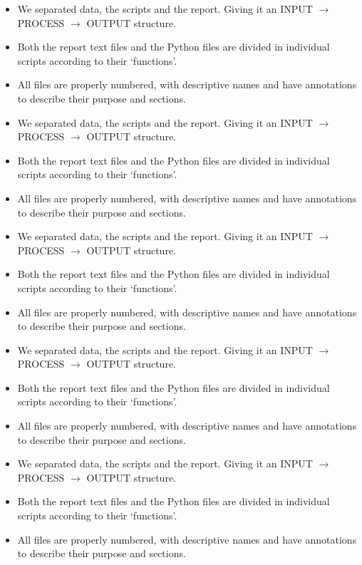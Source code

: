 \begin{itemize}
    \item We separated data, the scripts and the report. Giving it an INPUT $\rightarrow$ PROCESS $\rightarrow$ OUTPUT structure.
    \item Both the report text files and the Python files are divided in individual scripts according to their `functions'.
    \item All files are properly numbered, with descriptive names and have annotations to describe their purpose and sections.
\end{itemize}
\begin{itemize}
    \item We separated data, the scripts and the report. Giving it an INPUT $\rightarrow$ PROCESS $\rightarrow$ OUTPUT structure.
    \item Both the report text files and the Python files are divided in individual scripts according to their `functions'.
    \item All files are properly numbered, with descriptive names and have annotations to describe their purpose and sections.
\end{itemize}
\begin{itemize}
    \item We separated data, the scripts and the report. Giving it an INPUT $\rightarrow$ PROCESS $\rightarrow$ OUTPUT structure.
    \item Both the report text files and the Python files are divided in individual scripts according to their `functions'.
    \item All files are properly numbered, with descriptive names and have annotations to describe their purpose and sections.
\end{itemize}
\begin{itemize}
    \item We separated data, the scripts and the report. Giving it an INPUT $\rightarrow$ PROCESS $\rightarrow$ OUTPUT structure.
    \item Both the report text files and the Python files are divided in individual scripts according to their `functions'.
    \item All files are properly numbered, with descriptive names and have annotations to describe their purpose and sections.
\end{itemize}
\begin{itemize}
    \item We separated data, the scripts and the report. Giving it an INPUT $\rightarrow$ PROCESS $\rightarrow$ OUTPUT structure.
    \item Both the report text files and the Python files are divided in individual scripts according to their `functions'.
    \item All files are properly numbered, with descriptive names and have annotations to describe their purpose and sections.
\end{itemize}

